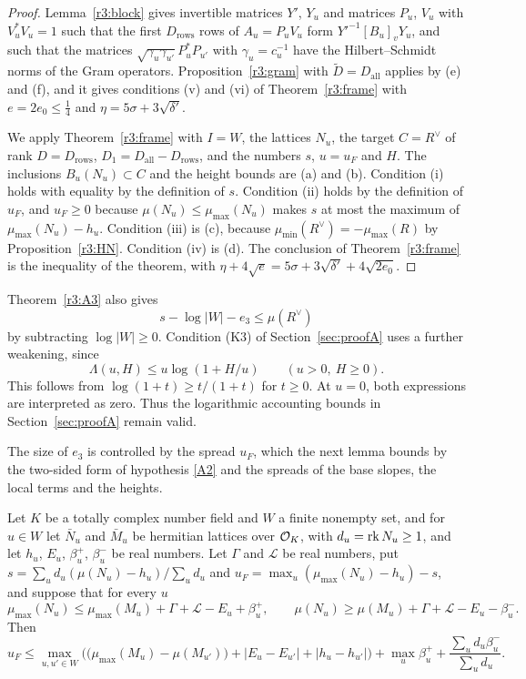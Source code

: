 \begin{proof}
Lemma~\ref{r3:block} gives invertible matrices $Y'$, $Y_u$ and matrices $P_u$, $V_u$ with $V_u^*V_u=1$ such that the first $D_{\mathrm{rows}}$ rows of $A_u=P_uV_u$ form $Y'^{-1}[B_u]_vY_u$, and such that the matrices $\sqrt{\gamma_u\gamma_{u'}}P_u^*P_{u'}$ with $\gamma_u=c_u^{-1}$ have the Hilbert--Schmidt norms of the Gram operators. Proposition~\ref{r3:gram} with $\widetilde D=D_{\mathrm{all}}$ applies by (e) and (f), and it gives conditions (v) and (vi) of Theorem~\ref{r3:frame} with $e=2e_0\le\frac14$ and $\eta=5\sigma+3\sqrt{\delta'}$.

We apply Theorem~\ref{r3:frame} with $I=W$, the lattices $N_u$, the target $C=R^\vee$ of rank $D=D_{\mathrm{rows}}$, $D_1=D_{\mathrm{all}}-D_{\mathrm{rows}}$, and the numbers $s$, $u=u_F$ and $H$. The inclusions $B_u(N_u)\subset C$ and the height bounds are (a) and (b). Condition (i) holds with equality by the definition of $s$. Condition (ii) holds by the definition of $u_F$, and $u_F\ge0$ because $\mu(N_u)\le\mu_{\max}(N_u)$ makes $s$ at most the maximum of $\mu_{\max}(N_u)-h_u$. Condition (iii) is (c), because $\mu_{\min}(R^\vee)=-\mu_{\max}(R)$ by Proposition~\ref{r3:HN}. Condition (iv) is (d). The conclusion of Theorem~\ref{r3:frame} is the inequality of the theorem, with $\eta+4\sqrt e=5\sigma+3\sqrt{\delta'}+4\sqrt{2e_0}$.
\end{proof}

\begin{remark}\label{r3:rem:log}
Theorem~\ref{r3:A3} also gives
\[
s-\log\lvert W\rvert-e_3\le\mu(R^\vee)
\]
by subtracting $\log\lvert W\rvert\ge0$.
Condition (K3) of Section~\ref{sec:proofA} uses
a further weakening, since
\[
\Lambda(u,H)\le u\log(1+H/u)
\qquad(u>0,\ H\ge0).
\]
This follows from
$\log(1+t)\ge t/(1+t)$ for $t\ge0$.
At $u=0$, both expressions are interpreted as zero.
Thus the logarithmic accounting bounds in
Section~\ref{sec:proofA} remain valid.
\end{remark}

The size of $e_3$ is controlled by the spread $u_F$, which the next lemma bounds by the two-sided form of hypothesis \eqref{A2} and the spreads of the base slopes, the local terms and the heights.

\begin{lemma}\label{r3:uF}
Let $K$ be a totally complex number field and $W$ a finite nonempty set, and for $u\in W$ let $\bar N_u$ and $\bar M_u$ be hermitian lattices over $\mathcal O_K$, with $d_u=\operatorname{rk} N_u\ge1$, and let $h_u$, $E_u$, $\beta_u^+$, $\beta_u^-$ be real numbers. Let $\Gamma$ and $\mathcal L$ be real numbers, put $s=\sum_ud_u(\mu(N_u)-h_u)/\sum_ud_u$ and $u_F=\max_u(\mu_{\max}(N_u)-h_u)-s$, and suppose that for every $u$
\[
\mu_{\max}(N_u)\le\mu_{\max}(M_u)+\Gamma+\mathcal L-E_u+\beta^+_u,\qquad\mu(N_u)\ge\mu(M_u)+\Gamma+\mathcal L-E_u-\beta^-_u .
\]
Then
\[
u_F\le\max_{u,u'\in W}\Big(\big(\mu_{\max}(M_u)-\mu(M_{u'})\big)+\lvert E_u-E_{u'}\rvert+\lvert h_u-h_{u'}\rvert\Big)+\max_u\beta^+_u+\frac{\sum_ud_u\beta^-_u}{\sum_ud_u}.
\]
\end{lemma}

